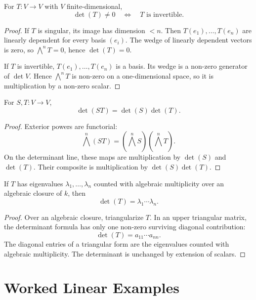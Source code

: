\documentclass[11pt]{memoir}
\begin{document}
\begin{proposition}
\label{prop:det-invertibility}
For \(T:V\to V\) with \(V\) finite-dimensional,
\[
  \det(T)\neq 0
  \quad\Longleftrightarrow\quad
  T\text{ is invertible}.
\]
\end{proposition}

\begin{proof}
If \(T\) is singular, its image has dimension \(<n\). Then
\(T(e_1),\dots,T(e_n)\) are linearly dependent for every basis
\((e_i)\). The wedge of linearly dependent vectors is zero, so
\(\bigwedge^nT=0\), hence \(\det(T)=0\).

If \(T\) is invertible, \(T(e_1),\dots,T(e_n)\) is a basis. Its wedge
is a non-zero generator of \(\det V\). Hence
\(\bigwedge^nT\) is non-zero on a one-dimensional space, so it is
multiplication by a non-zero scalar.
\end{proof}

\begin{proposition}[multiplicativity]
\label{prop:multiplicativity}
For \(S,T:V\to V\),
\[
  \det(ST)=\det(S)\det(T).
\]
\end{proposition}

\begin{proof}
Exterior powers are functorial:
\[
  \bigwedge^n(ST)=(\bigwedge^nS)(\bigwedge^nT).
\]
On the determinant line, these maps are multiplication by
\(\det(S)\) and \(\det(T)\). Their composite is multiplication by
\(\det(S)\det(T)\).
\end{proof}

\begin{proposition}
\label{prop:eigenvalue-product}
If \(T\) has eigenvalues \(\lambda_1,\dots,\lambda_n\) counted with
algebraic multiplicity over an algebraic closure of \(k\), then
\[
  \det(T)=\lambda_1\cdots\lambda_n.
\]
\end{proposition}

\begin{proof}
Over an algebraic closure, triangularize \(T\). In an upper triangular
matrix, the determinant formula has only one non-zero surviving
diagonal contribution:
\[
  \det(T)=a_{11}\cdots a_{nn}.
\]
The diagonal entries of a triangular form are the eigenvalues counted
with algebraic multiplicity. The determinant is unchanged by extension
of scalars.
\end{proof}

\section{Worked Linear Examples}
\label{sec:worked-linear-examples}
\end{document}
